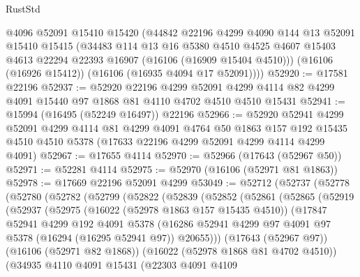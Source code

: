 \begin{lexlean}{RustStd}
\begin{coremodule}
      @4096
      @52091
      @15410
      @15420
      (@44842
        @22196
        @4299
        @4090
        @144
        @13
        @52091
        @15410
        @15415
        (@34483
          @114
          @13
          @16
          @5380
          @4510
          @4525
          @4607
          @15403
          @4613
          @22294
          @22393
          @16907
          (@16106 (@16909 @15404 @4510)))
        (@16106 (@16926 @15412))
        (@16106 (@16935 @4094 @17 @52091))))
@52920 := @17581 @22196
@52937 := @52920
    @22196
    @4299
    @52091
    @4299
    @4114
    @82
    @4299
    @4091
    @15440
    @97
    @1868
    @81
    @4110
    @4702
    @4510
    @4510
    @15431
@52941 := @15994 (@16495 (@52249 @16497)) @22196
@52966 := @52920
    @52941
    @4299
    @52091
    @4299
    @4114
    @81
    @4299
    @4091
    @4764
    @50
    @1863
    @157
    @192
    @15435
    @4510
    @4510
    @5378
    (@17633 @22196 @4299 @52091 @4299 @4114 @4299 @4091)
@52967 := @17655 @4114
@52970 := @52966 (@17643 (@52967 @50))
@52971 := @52281 @4114
@52975 := @52970 (@16106 (@52971 @81 @1863))
@52978 := @17669 @22196 @52091 @4299
@53049 := @52712
    (@52737
      (@52778
        (@52780
          (@52782
            (@52799
              (@52822
                (@52839
                  (@52852
                    (@52861
                      (@52865
                        (@52919
                          (@52937
                            (@52975
                              (@16022 (@52978 @1863 @157 @15435 @4510))
                              (@17847
                                @52941
                                @4299
                                @192
                                @4091
                                @5378
                                (@16286
                                  @52941
                                  @4299
                                  @97
                                  @4091
                                  @97
                                  @5378
                                  (@16294 (@16295 @52941 @97))
                                  @20655)))
                            (@17643 (@52967 @97))
                            (@16106 (@52971 @82 @1868))
                            (@16022 (@52978 @1868 @81 @4702 @4510))
                            (@34935
                              @4110
                              @4091
                              @15431
                              (@22303
                                @4091
                                @4109

\end{coremodule}
\end{lexlean}
